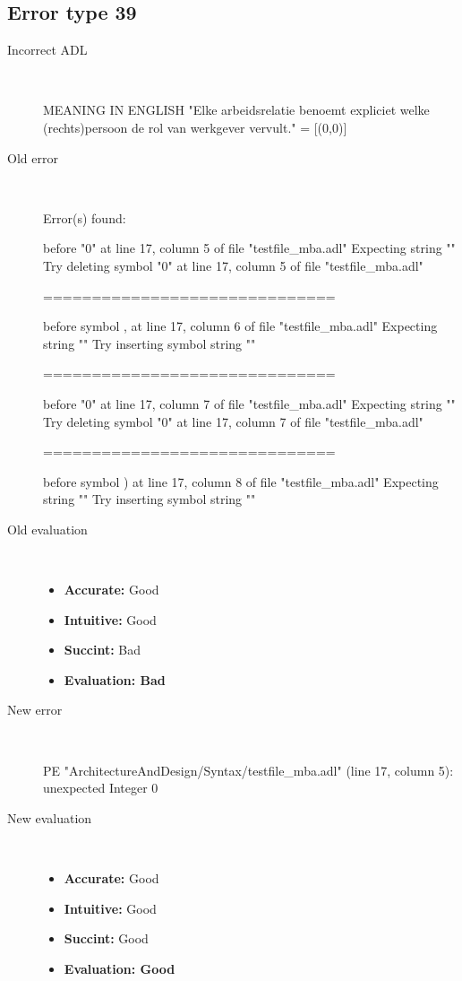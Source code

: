 \hrulefill

\subsection{Error type 39}
  \begin{description}
  \item[Incorrect ADL]~\\
\begin{adl}
MEANING IN ENGLISH "Elke arbeidsrelatie benoemt expliciet welke (rechts)persoon de rol van werkgever vervult."
= [(0,0)]\end{adl}
  \item[Old error]~\\
\begin{haskell}
Error(s) found:

before "0" at line 17, column 5 of file "testfile_mba.adl"
Expecting string ""
Try deleting symbol "0" at line 17, column 5 of file "testfile_mba.adl"

==============================

before symbol , at line 17, column 6 of file "testfile_mba.adl"
Expecting string ""
Try inserting symbol string ""

==============================

before "0" at line 17, column 7 of file "testfile_mba.adl"
Expecting string ""
Try deleting symbol "0" at line 17, column 7 of file "testfile_mba.adl"

==============================

before symbol ) at line 17, column 8 of file "testfile_mba.adl"
Expecting string ""
Try inserting symbol string ""\end{haskell}
  \item[Old evaluation]~\\
    \begin{itemize}
    \item \textbf{Accurate:} Good
    \item \textbf{Intuitive:} Good
    \item \textbf{Succint:} Bad
    \item \textbf{Evaluation: Bad}
    \end{itemize}
  \item[New error]~\\
\begin{haskell}
PE "ArchitectureAndDesign/Syntax/testfile_mba.adl" (line 17, column 5):
unexpected Integer 0\end{haskell}
  \item[New evaluation]~\\
    \begin{itemize}
    \item \textbf{Accurate:} Good
    \item \textbf{Intuitive:} Good
    \item \textbf{Succint:} Good
    \item \textbf{Evaluation: Good
}
    \end{itemize}
  \end{description}

